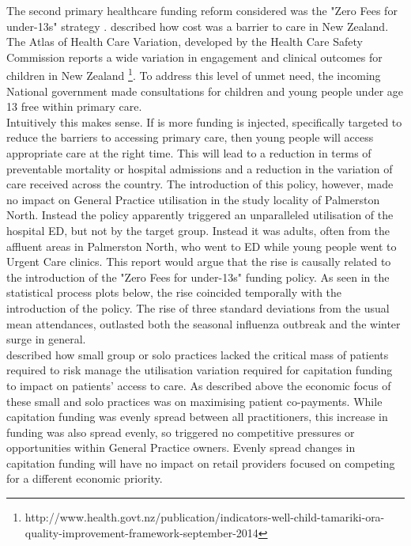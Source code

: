 \documentclass[11pt,a4paper]{article}
\begin{document}
The second primary healthcare funding reform considered was the "Zero Fees for under-13s" strategy \citep{frizelle2014health}. \citet{schoen2009survey} described how cost was a barrier to care in New Zealand. The Atlas of Health Care Variation, developed by the Health Care Safety Commission reports a wide variation in engagement and clinical outcomes for children in New Zealand \footnote{http://www.health.govt.nz/publication/indicators-well-child-tamariki-ora-quality-improvement-framework-september-2014}. To address this level of unmet need, the incoming National government made consultations for children and young people under age 13 free within primary care\citep{frizelle2014health}. \\


Intuitively this makes sense. If is more funding is injected, specifically targeted to reduce the barriers to accessing primary care, then young people will access appropriate care at the right time. This will lead to a reduction in terms of preventable mortality or hospital admissions and a reduction in the variation of care received across the country. The introduction of this policy, however, made no impact on General Practice utilisation in the study locality of Palmerston North. Instead the policy apparently triggered an unparalleled utilisation of the hospital ED, but not by the target group. Instead it was adults, often from the affluent areas in Palmerston North, who went to ED while young people went to Urgent Care clinics. This report would argue that the rise is causally related to the introduction of the "Zero Fees for under-13s" funding policy. As seen in the statistical process plots below, the rise coincided temporally with the introduction of the policy. The rise of three standard deviations from the usual mean attendances, outlasted both the seasonal influenza outbreak and the winter surge in general.\\


\citet{howell2005restructuring} described how small group or solo practices lacked the critical mass of patients required to risk manage the utilisation variation required for capitation funding to impact on patients' access to care. As described above the economic focus of these small and solo practices was on maximising patient co-payments. While capitation funding was evenly spread between all practitioners, this increase in funding was also spread evenly, so triggered no competitive pressures or opportunities within General Practice owners. Evenly spread changes in capitation funding will have no impact on retail providers focused on competing for a different economic priority.\\
\end{document}

